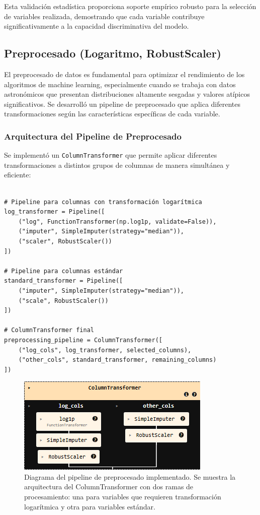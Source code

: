 \documentclass{article}
\begin{document}
Esta validación estadística proporciona soporte empírico robusto para la selección de variables realizada, demostrando que cada variable contribuye significativamente a la capacidad discriminativa del modelo.

\subsection{Preprocesado (Logaritmo, RobustScaler)}

El preprocesado de datos es fundamental para optimizar el rendimiento de los algoritmos de machine learning, especialmente cuando se trabaja con datos astronómicos que presentan distribuciones altamente sesgadas y valores atípicos significativos. Se desarrolló un pipeline de preprocesado que aplica diferentes transformaciones según las características específicas de cada variable.

\subsubsection{Arquitectura del Pipeline de Preprocesado}

Se implementó un \texttt{ColumnTransformer} que permite aplicar diferentes transformaciones a distintos grupos de columnas de manera simultánea y eficiente:

\begin{verbatim}

# Pipeline para columnas con transformación logarítmica
log_transformer = Pipeline([
    ("log", FunctionTransformer(np.log1p, validate=False)),
    ("imputer", SimpleImputer(strategy="median")),
    ("scaler", RobustScaler())
])

# Pipeline para columnas estándar
standard_transformer = Pipeline([
    ("imputer", SimpleImputer(strategy="median")),
    ("scale", RobustScaler())
])

# ColumnTransformer final
preprocessing_pipeline = ColumnTransformer([
    ("log_cols", log_transformer, selected_columns),
    ("other_cols", standard_transformer, remaining_columns)
])
\end{verbatim}

\begin{figure}[H]
    \centering
    \includegraphics[width=0.6\linewidth]{preprocesado_pipeline.png}
    \caption{Diagrama del pipeline de preprocesado implementado. Se muestra la arquitectura del ColumnTransformer con dos ramas de procesamiento: una para variables que requieren transformación logarítmica y otra para variables estándar.}
    \label{fig:pipeline_preprocesado}
\end{figure}
\end{document}
